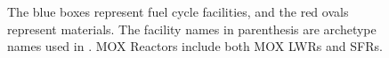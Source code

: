 \begin{figure}
{\begin{tikzpicture}[align=center, node distance = 3cm and 3cm, auto]
                \end{tikzpicture}
        
                }
                \caption{The blue boxes represent fuel cycle facilities, and the red ovals
	                	 represent materials. The facility names in parenthesis are archetype names
	                	 used in \Cyclus. \gls{MOX} Reactors include both \gls{MOX} \glspl{LWR} and
	                	 \glspl{SFR}.}
                \label{diag:fc}
\end{figure}
\FloatBarrier